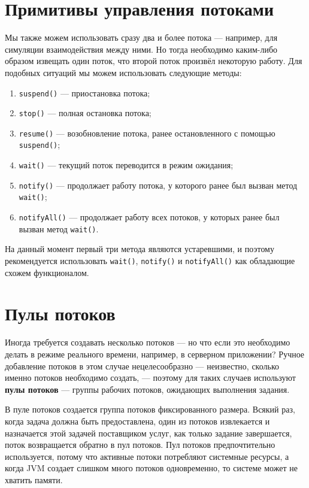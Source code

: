\section{Примитивы управления потоками}

Мы также можем использовать сразу два и более потока — например, для симуляции взаимодействия между ними. Но тогда необходимо каким-либо образом извещать один поток, что второй поток произвёл некоторую работу. Для подобных ситуаций мы можем использовать следующие методы:

\begin{enumerate}
    \item \verb|suspend()| — приостановка потока;
    \item \verb|stop()| — полная остановка потока;
    \item \verb|resume()| — возобновление потока, ранее остановленного с помощью \verb|suspend()|;
    \item \verb|wait()| — текущий поток переводится в режим ожидания;
    \item \verb|notify()| — продолжает работу потока, у которого ранее был вызван метод \verb|wait()|;
    \item \verb|notifyAll()| — продолжает работу всех потоков, у которых ранее был вызван метод \verb|wait()|.
\end{enumerate}

На данный момент первый три метода являются устаревшими, и поэтому рекомендуется использовать \verb|wait()|, \verb|notify()| и \verb|notifyAll()| как обладающие схожем функционалом.

\section{Пулы потоков}

Иногда требуется создавать несколько потоков — но что если это необходимо делать в режиме реального времени, например, в серверном приложении? Ручное добавление потоков в этом случае нецелесообразно — неизвестно, сколько именно потоков необходимо создать, — поэтому для таких случаев используют \textbf{пулы потоков} — группы рабочих потоков, ожидающих выполнения задания.

В пуле потоков создается группа потоков фиксированного размера. Всякий раз, когда задача должна быть предоставлена, один из потоков извлекается и назначается этой задачей поставщиком услуг, как только задание завершается, поток возвращается обратно в пул потоков. Пул потоков предпочтительно используется, потому что активные потоки потребляют системные ресурсы, а когда JVM создает слишком много потоков одновременно, то системе может не хватить памяти.

